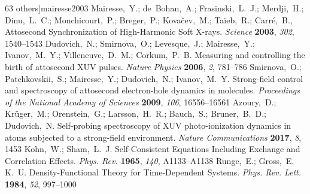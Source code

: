 \documentclass[journal=jacsat,manuscript=article]{achemso}
\begin{document}
\begin{mcitethebibliography}{63}
  others]{mairesse2003}
Mairesse,~Y.; de~Bohan,~A.; Frasinski,~L.~J.; Merdji,~H.; Dinu,~L.~C.;
  Monchicourt,~P.; Breger,~P.; Kovačev,~M.; Taïeb,~R.; Carré,~B.,
    Attosecond Synchronization of High-Harmonic Soft X-rays.
  \emph{Science} \textbf{2003}, \emph{302}, 1540--1543\relax
\mciteBstWouldAddEndPuncttrue
\mciteSetBstMidEndSepPunct{\mcitedefaultmidpunct}
{\mcitedefaultendpunct}{\mcitedefaultseppunct}\relax
\EndOfBibitem
{}
Dudovich,~N.; Smirnova,~O.; Levesque,~J.; Mairesse,~Y.; Ivanov,~M.~Y.;
  Villeneuve,~D.~M.; Corkum,~P.~B. Measuring and controlling the birth of
  attosecond XUV pulses. \emph{Nature Physics} \textbf{2006}, \emph{2},
  781--786\relax
\mciteBstWouldAddEndPuncttrue
\mciteSetBstMidEndSepPunct{\mcitedefaultmidpunct}
{\mcitedefaultendpunct}{\mcitedefaultseppunct}\relax
\EndOfBibitem
{}
Smirnova,~O.; Patchkovskii,~S.; Mairesse,~Y.; Dudovich,~N.; Ivanov,~M.~Y.
  Strong-field control and spectroscopy of attosecond electron-hole dynamics in
  molecules. \emph{Proceedings of the National Academy of Sciences}
  \textbf{2009}, \emph{106}, 16556--16561\relax
\mciteBstWouldAddEndPuncttrue
\mciteSetBstMidEndSepPunct{\mcitedefaultmidpunct}
{\mcitedefaultendpunct}{\mcitedefaultseppunct}\relax
\EndOfBibitem
{}
Azoury,~D.; Kr{\"u}ger,~M.; Orenstein,~G.; Larsson,~H.~R.; Bauch,~S.;
  Bruner,~B.~D.; Dudovich,~N. Self-probing spectroscopy of XUV photo-ionization
  dynamics in atoms subjected to a strong-field environment. \emph{Nature
  Communications} \textbf{2017}, \emph{8}, 1453\relax
\mciteBstWouldAddEndPuncttrue
\mciteSetBstMidEndSepPunct{\mcitedefaultmidpunct}
{\mcitedefaultendpunct}{\mcitedefaultseppunct}\relax
\EndOfBibitem
{}
Kohn,~W.; Sham,~L.~J. Self-Consistent Equations Including Exchange and
  Correlation Effects. \emph{Phys. Rev.} \textbf{1965}, \emph{140},
  A1133--A1138\relax
\mciteBstWouldAddEndPuncttrue
\mciteSetBstMidEndSepPunct{\mcitedefaultmidpunct}
{\mcitedefaultendpunct}{\mcitedefaultseppunct}\relax
\EndOfBibitem
{}
Runge,~E.; Gross,~E. K.~U. Density-Functional Theory for Time-Dependent
  Systems. \emph{Phys. Rev. Lett.} \textbf{1984}, \emph{52}, 997--1000\relax
\mciteBstWouldAddEndPuncttrue

\end{mcitethebibliography}
\end{document}
